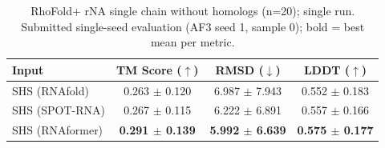 \begin{table}[htbp]
\centering
\caption{RhoFold+ rNA single chain without homologs (n=20); single run. Submitted single-seed evaluation (AF3 seed 1, sample 0); bold = best mean per metric.}
\label{tab:rf_rna_single_chain_without_homologs}
\begin{tabular}{lccc}
\toprule
Input & TM Score ($\uparrow$) & RMSD ($\downarrow$) & LDDT ($\uparrow$) \\
\midrule
SHS (RNAfold) & 0.263 $\pm$ 0.120 & 6.987 $\pm$ 7.943 & 0.552 $\pm$ 0.183 \\
SHS (SPOT-RNA) & 0.267 $\pm$ 0.115 & 6.222 $\pm$ 6.891 & 0.557 $\pm$ 0.166 \\
SHS (RNAformer) & \textbf{0.291 $\pm$ 0.139} & \textbf{5.992 $\pm$ 6.639} & \textbf{0.575 $\pm$ 0.177} \\
\bottomrule
\end{tabular}
\end{table}
